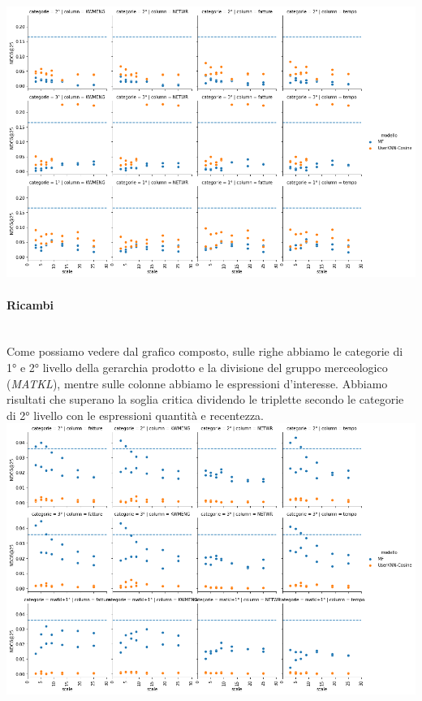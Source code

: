 \includegraphics[width=16cm]{figures/risultati_ordered_categoria_macchine.png}
\newpage

\paragraph{Ricambi}\mbox{} \\
Come possiamo vedere dal grafico composto, sulle righe abbiamo le categorie di 1° e 2° livello della gerarchia prodotto e la divisione del gruppo merceologico (\textit{MATKL}), mentre sulle colonne abbiamo le espressioni d'interesse. Abbiamo risultati che superano la soglia critica dividendo le triplette secondo le categorie di 2° livello con le espressioni quantità e recentezza.\\

\includegraphics[width=16cm]{figures/risultati_ordered_categoria_ricambi.png}


